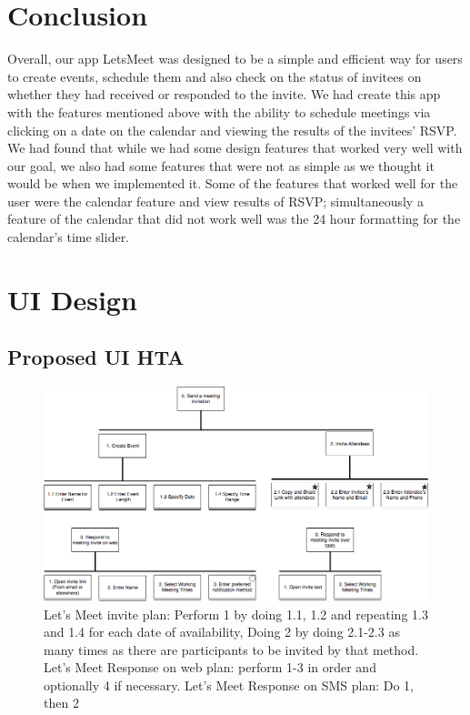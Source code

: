\documentclass{sigchi}
\begin{document}
\section{Conclusion}

Overall, our app LetsMeet was designed to be a simple and efficient way for users to create events, schedule them and also check on the status of invitees on whether they had received or responded to the invite. We had create this app with the features mentioned above with the ability to schedule meetings via clicking on a date on the calendar and viewing the results of the invitees' RSVP. We had found that while we had some design features that worked very well with our goal, we also had some features that were not as simple as we thought it would be when we implemented it. Some of the features that worked well for the user were the calendar feature and view results of RSVP; simultaneously a feature of the calendar that did not work well was the 24 hour formatting for the calendar's time slider. 



\FloatBarrier


\balance{}

\newpage




\section{UI Design}
\subsection{Proposed UI HTA}

\FloatBarrier
\begin{figure}
  \centering
  \includegraphics[width=1.75\columnwidth]{figures/LetsMeetHTA}
  \caption{Let's Meet invite plan: Perform 1 by doing 1.1, 1.2 and repeating 1.3 and 1.4 for each date of availability, Doing 2 by doing 2.1-2.3 as many times as there are participants to be invited by that method. Let's Meet Response on web plan: perform 1-3 in order and optionally 4 if necessary. Let's Meet Response on SMS plan: Do 1, then 2}
\end{figure}
\FloatBarrier
\end{document}

